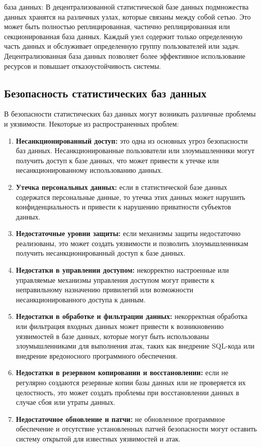 \begin{enumerate}
\begin{itemize}
         база данных: В децентрализованной статистической базе данных подмножества данных хранятся на различных узлах, которые связаны между собой сетью. Это может быть полностью реплицированная, частично реплицированная или секционированная база данных. Каждый узел содержит только определенную часть данных и обслуживает определенную группу пользователей или задач. Децентрализованная база данных позволяет более эффективное использование ресурсов и повышает отказоустойчивость системы.
    \end{itemize}
\end{enumerate}

\subsection{Безопасность статистических баз данных}

В безопасности статистических баз данных могут возникать различные проблемы и уязвимости. Некоторые из распространенных проблем:
\\

\begin{enumerate}
    \item \textbf{Несанкционированный доступ: } это одна из основных угроз безопасности баз данных. Несанкционированные пользователи или злоумышленники могут получить доступ к базе данных, что может привести к утечке или несанкционированному использованию данных.
    \item \textbf{Утечка персональных данных: } если в статистической базе данных содержатся персональные данные, то утечка этих данных может нарушить конфиденциальность и привести к нарушению приватности субъектов данных.
    \item \textbf{Недостаточные уровни защиты: } если механизмы защиты недостаточно реализованы, это может создать уязвимости и позволить злоумышленникам получить несанкционированный доступ к базе данных.
    \item \textbf{Недостатки в управлении доступом: } некорректно настроенные или управляемые механизмы управления доступом могут привести к неправильному назначению привилегий или возможности несанкционированного доступа к данным.
    \item \textbf{Недостатки в обработке и фильтрации данных: } некорректная обработка или фильтрация входных данных может привести к возникновению уязвимостей в базе данных, которые могут быть использованы злоумышленниками для выполнения атак, таких как внедрение SQL-кода или внедрение вредоносного программного обеспечения.
    \item \textbf{Недостатки в резервном копировании и восстановлении: } если не регулярно создаются резервные копии базы данных или не проверяется их целостность, это может создать проблемы при восстановлении данных в случае сбоя или утраты данных.
    \item \textbf{Недостаточное обновление и патчи: } не обновленное программное обеспечение и отсутствие установленных патчей безопасности могут оставить систему открытой для известных уязвимостей и атак.
    
\end{enumerate}
\\


